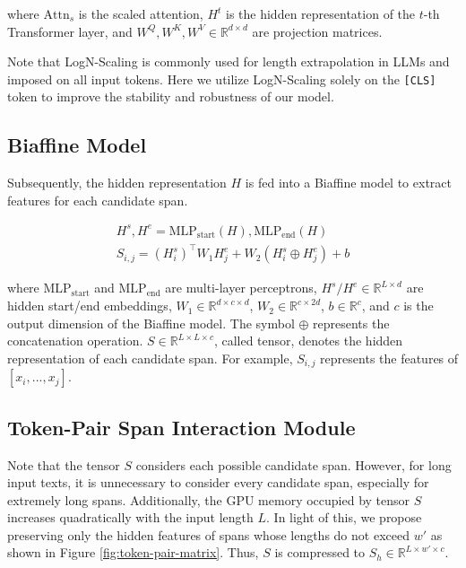 \noindent where $\text{Attn}_{s}$ is the scaled attention,
$H^{t}$ is the hidden representation of the $t$-th Transformer layer, and $W^{Q}, W^{K}, W^{V}\in \mathbb{R}^{d\times d}$ are projection matrices.

Note that LogN-Scaling is commonly used for length extrapolation in LLMs and imposed on all input tokens.
Here we utilize LogN-Scaling solely on the \texttt{[CLS]} token to improve the stability and robustness of our model.

\subsection{Biaffine Model}
Subsequently, the hidden representation $H$ is fed into a Biaffine
model to extract features for each candidate span.

\begin{align}
H^{s}, H^{e}=\text{MLP}_{\text{start}}\left ( H \right ), \text{MLP}_{\text{end}}\left ( H \right )\\
S_{i, j}=( H^{s}_i )^{\top}W_{1}H^{e}_j +W_{2} ( H^{s}_i\oplus H^{e}_j )+b\label{eq2}
\end{align}

\noindent where $\text{MLP}_{\text{start}}$ and $\text{MLP}_{\text{end}}$ are multi-layer perceptrons, 
$H^{s}/H^{e}\in \mathbb{R}^{L\times d}$ are hidden start/end embeddings, 
$W_{1}\in \mathbb{R}^{d\times c\times d}$, $W_{2}\in \mathbb{R}^{c\times 2d}$, $b\in \mathbb{R}^{c}$, 
and $c$ is the output dimension of the Biaffine model. The symbol $\oplus$ represents the concatenation operation. $S\in \mathbb{R}^{L\times L\times c}$, called \tokenspan tensor, 
denotes the hidden representation of each candidate span. 
For example, $S_{i, j}$ represents the features of $\left [ x_{i}, ..., x_{j} \right ]$.

\subsection{Token-Pair Span Interaction Module}

Note that the \tokenspan tensor  
$S$ considers each possible candidate span.
However, for long input texts,
it is unnecessary to consider every candidate span,
especially for extremely long spans.
Additionally, the GPU memory occupied by tensor $S$ increases quadratically with the input length $L$.
In light of this, we propose preserving only the hidden features of spans whose lengths do not exceed
$w'$ as shown in Figure \ref{fig:token-pair-matrix}.
Thus, $S$ is compressed to $S_{h} \in \mathbb{R}^{L\times w'\times c}$.

